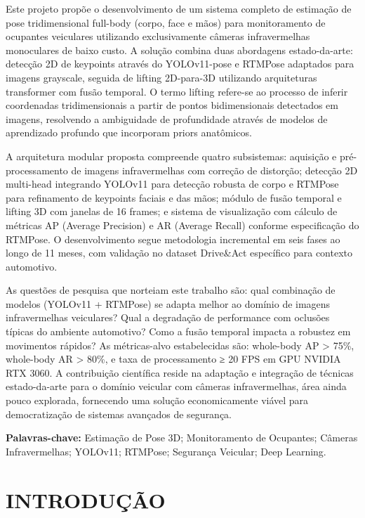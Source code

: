 \documentclass[12pt, a4paper]{article}
\begin{document}
Este projeto propõe o desenvolvimento de um sistema completo de estimação de pose tridimensional full-body (corpo, face e mãos) para monitoramento de ocupantes veiculares utilizando exclusivamente câmeras infravermelhas monoculares de baixo custo. A solução combina duas abordagens estado-da-arte: detecção 2D de keypoints através do YOLOv11-pose e RTMPose adaptados para imagens grayscale, seguida de lifting 2D-para-3D utilizando arquiteturas transformer com fusão temporal. O termo lifting refere-se ao processo de inferir coordenadas tridimensionais a partir de pontos bidimensionais detectados em imagens, resolvendo a ambiguidade de profundidade através de modelos de aprendizado profundo que incorporam priors anatômicos.

A arquitetura modular proposta compreende quatro subsistemas: aquisição e pré-processamento de imagens infravermelhas com correção de distorção; detecção 2D multi-head integrando YOLOv11 para detecção robusta de corpo e RTMPose para refinamento de keypoints faciais e das mãos; módulo de fusão temporal e lifting 3D com janelas de 16 frames; e sistema de visualização com cálculo de métricas AP (Average Precision) e AR (Average Recall) conforme especificação do RTMPose. O desenvolvimento segue metodologia incremental em seis fases ao longo de 11 meses, com validação no dataset Drive\&Act específico para contexto automotivo.

As questões de pesquisa que norteiam este trabalho são: qual combinação de modelos (YOLOv11 + RTMPose) se adapta melhor ao domínio de imagens infravermelhas veiculares? Qual a degradação de performance com oclusões típicas do ambiente automotivo? Como a fusão temporal impacta a robustez em movimentos rápidos? As métricas-alvo estabelecidas são: whole-body AP > 75\%, whole-body AR > 80\%, e taxa de processamento ≥ 20 FPS em GPU NVIDIA RTX 3060. A contribuição científica reside na adaptação e integração de técnicas estado-da-arte para o domínio veicular com câmeras infravermelhas, área ainda pouco explorada, fornecendo uma solução economicamente viável para democratização de sistemas avançados de segurança.

\vspace{0.5cm}
\noindent\textbf{Palavras-chave:} Estimação de Pose 3D; Monitoramento de Ocupantes; Câmeras Infravermelhas; YOLOv11; RTMPose; Segurança Veicular; Deep Learning.

\section{INTRODUÇÃO}
\end{document}
